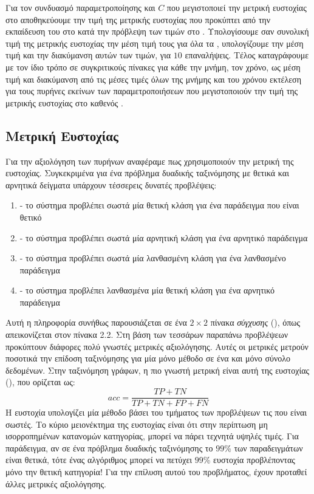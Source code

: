 Για τον συνδυασμό παραμετροποίησης και $C$ που μεγιστοποιεί την μετρική ευστοχίας στο  αποθηκεύουμε την τιμή της μετρικής ευστοχίας που προκύπτει από την εκπαίδευση του  στο  κατά την πρόβλεψη των τιμών στο .
Υπολογίσουμε σαν συνολική τιμή της μετρικής ευστοχίας την μέση τιμή τους για όλα τα , υπολογίζουμε την μέση τιμή και την διακύμανση αυτών των τιμών, για $10$ επαναλήψεις.
Τέλος καταγράφουμε με τον ίδιο τρόπο σε συγκριτικούς πίνακες για κάθε  την μνήμη, τον χρόνο, ως μέση τιμή και διακύμανση από τις μέσες τιμές όλων της μνήμης και του χρόνου εκτέλεση για τους πυρήνες εκείνων των παραμετροποιήσεων που μεγιστοποιούν την τιμή της μετρικής ευστοχίας στο  καθενός .

\subsection{Μετρική Ευστοχίας}
\label{subsection:accuracy}
Για την αξιολόγηση των πυρήνων αναφέραμε πως χρησιμοποιούν την μετρική της ευστοχίας.
Συγκεκριμένα για ένα πρόβλημα δυαδικής ταξινόμησης με θετικά και αρνητικά δείγματα υπάρχουν τέσσερεις δυνατές προβλέψεις:
\begin{enumerate}
    \item {} - το σύστημα προβλέπει σωστά μία θετική κλάση για ένα παράδειγμα που είναι θετικό
    \item {} - το σύστημα προβλέπει σωστά μία αρνητική κλάση για ένα αρνητικό παράδειγμα
    \item {} - το σύστημα προβλέπει σωστά μία λανθασμένη κλάση για ένα λανθασμένο παράδειγμα
    \item {} - το σύστημα προβλέπει λανθασμένα μία θετική κλάση για ένα αρνητικό παράδειγμα
\end{enumerate}
Αυτή η πληροφορία συνήθως παρουσιάζεται σε ένα $2 \times 2$ πίνακα \textit{σύγχυσης} (), όπως απεικονίζεται στον πίνακα 2.2.
Στη βάση των τεσσάρων παραπάνω προβλέψεων προκύπτουν διάφορες πολύ γνωστές μετρικές αξιολόγησης.
Αυτές οι μετρικές μετρούν ποσοτικά την επίδοση ταξινόμησης για μία μόνο μέθοδο σε ένα και μόνο σύνολο δεδομένων.
Στην ταξινόμηση γράφων, η πιο γνωστή μετρική είναι αυτή της ευστοχίας (), που ορίζεται ως:
\begin{equation}
    acc = \frac{TP + TN}{TP + TN + FP + FN}    
\end{equation}
Η ευστοχία υπολογίζει μία μέθοδο βάσει του τμήματος των προβλέψεων τις που είναι σωστές.
Το κύριο μειονέκτημα της ευστοχίας είναι ότι στην περίπτωση μη ισορροπημένων κατανομών κατηγορίας, μπορεί να πάρει τεχνητά υψηλές τιμές.
Για παράδειγμα, αν σε ένα πρόβλημα δυαδικής ταξινόμησης το $99$\% των παραδειγμάτων είναι θετικά, τότε ένας αλγόριθμος μπορεί να πετύχει $99$\% ευστοχία προβλέποντας μόνο την θετική κατηγορία!
Για την επίλυση αυτού του προβλήματος, έχουν προταθεί άλλες μετρικές αξιολόγησης.

